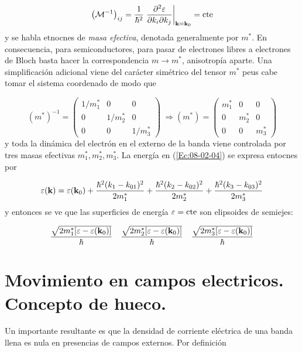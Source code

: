 \begin{equation}
	\left( \mathcal{M}^{-1} \right)_{ij} = \frac{1}{\hbar^2} \left. \frac{\partial ^2 \varepsilon}{\partial  k_i \partial k_j} \right|_{\mathbf{k}=\mathbf{k}_0} = \text{cte}
\end{equation}
y se habla etnocnes de \textit{masa efectiva}, denotada generalmente por $m^*$. En consecuencia, para semiconductores, para pasar de electrones libres a electrones de Bloch basta hacer la correspondencia $m\rightarrow m^*$, anisotropía aparte. Una simplificación adicional viene del carácter simétrico del tensor $m^*$ peus cabe tomar el sistema coordenado de modo que

\begin{equation}
	(m^*)^{-1} = \begin{pmatrix}
		1/m_1^* & 0 & 0 \\
		0 & 1/m_2^* & 0 \\
		0 & 0 & 1/m_3^* 
	\end{pmatrix} \ \Rightarrow (m^*) = \begin{pmatrix}
		m_1^* & 0 & 0 \\
		0 & m_2^* & 0 \\
		0 & 0 & m_3^* 
	\end{pmatrix} 
\end{equation}
y toda la dinámica del electrón en el externo de la banda viene controlada por tres masas efectivas $m_1^*,m_2^*,m_3^*$. La energía en (\ref{Ec:08-02-04}) se expresa entocnes por

\begin{equation}
	\varepsilon (\mathbf{k}) = \varepsilon (\mathbf{k}_0) + \frac{\hbar^2 (k_1-k_{01})^2}{2m_1^*} + \frac{\hbar^2 (k_2-k_{02})^2}{2m_2^*} + \frac{\hbar^2 (k_3-k_{03})^2}{2m_3^*}
\end{equation}
y entonces se ve que las superficies de energía $\varepsilon=\text{cte}$ son elipsoides de semiejes:

\begin{equation}
	\frac{\sqrt{2m_1^* [\varepsilon-\varepsilon(\mathbf{k}_0)]}}{\hbar} \quad 
	\frac{\sqrt{2m_2^* [\varepsilon-\varepsilon(\mathbf{k}_0)]}}{\hbar} \quad
	\frac{\sqrt{2m_3^* [\varepsilon-\varepsilon(\mathbf{k}_0)]}}{\hbar}
\end{equation}

\section{Movimiento en campos electricos. Concepto de hueco.}

Un importante resultante es que la densidad de corriente eléctrica de una banda llena es nula en presencias de campos externos. Por definición 

